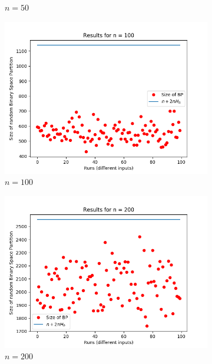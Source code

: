 \documentclass[letterpaper]{article}
\begin{document}
\begin{figure}[H]
\begin{subfigure}{.33\textwidth}
      \caption{$n = 50$}
    \end{subfigure}
    \begin{subfigure}{.33\textwidth}
      \centering
      \includegraphics[width=1\linewidth]{images/assign1/random/inputs_100}
      \caption{$n = 100$}
    \end{subfigure}
    \begin{subfigure}{.33\textwidth}
      \centering
      \includegraphics[width=1\linewidth]{images/assign1/random/inputs_200}
      \caption{$n = 200$}
    \end{subfigure}
    \begin{subfigure}{.33\textwidth}
      \centering

\end{subfigure}
\end{figure}
\end{document}

